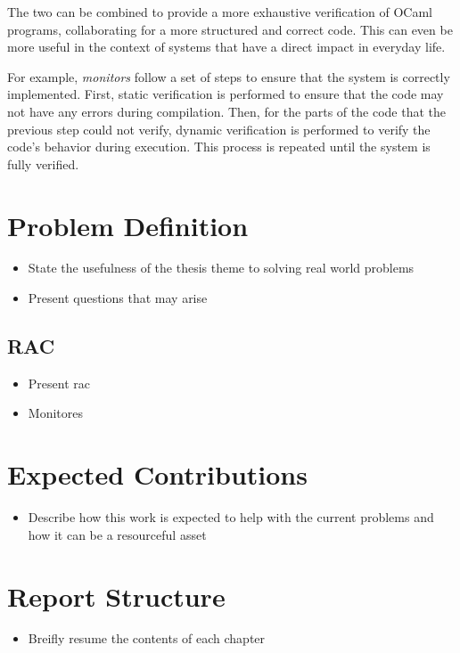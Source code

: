 The two can  be combined to provide a more exhaustive verification of OCaml programs, 
collaborating for a more structured and correct code. This can even be more useful in the context of 
systems that have a direct impact in everyday life.

For example, \textit{monitors} follow a set of steps to ensure that the system is correctly implemented. 
First, static verification is performed to ensure that the code may not have any errors during compilation.
Then, for the parts of the code that the previous step could not verify, dynamic verification is performed 
to verify the code's behavior during execution. This process is repeated until the system is fully verified.

\section{Problem Definition}
\label{sec:problem_definition}

\begin{itemize}
    \item State the usefulness of the thesis theme to solving real world problems
    \item Present questions that may arise
\end{itemize}

\subsection{RAC}
\label{sub:rac}

\begin{itemize}
    \item Present \gls{rac}
\end{itemize}

\begin{itemize}
    \item Monitores
\end{itemize}

\section{Expected Contributions}
\label{sec:expected_Contributions}

\begin{itemize}
    \item Describe how this work is expected to help with the current problems
    and how it can be a resourceful asset
\end{itemize}

\section{Report Structure}
\label{sec:report_structure}

\begin{itemize}
    \item Breifly resume the contents of each chapter
\end{itemize}